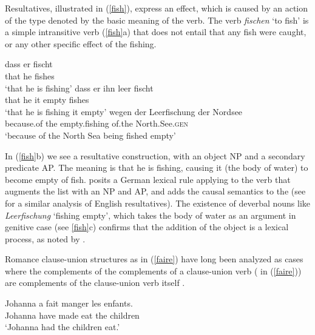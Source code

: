 \documentclass[output=paper]{langsci/langscibook}
\begin{document}
Resultatives, illustrated in (\ref{fish}), express an effect, which is caused by an action of the type denoted by the basic meaning of the verb. The verb \textit{fischen} `to fish' is a simple intransitive verb (\ref{fish}a) that does not entail that any fish were caught, or any other specific effect of the fishing.  

\begin{exe}
\ex\label{fish}
\begin{xlist}
\ex
\gll dass er  fischt\\
     that he  fishes\\
\glt `that he is fishing'
\ex 
\gll dass er ihn leer fischt\\
     that he it empty fishes\\
\glt `that he is fishing it empty'
\ex 
\gll wegen der Leerfischung der Nordsee \\
     because.of the empty.fishing of.the North.See.\textsc{gen} \\
\glt `because of the North Sea being fished empty'
\end{xlist}
\end{exe}

\noindent
 In (\ref{fish}b) we see a resultative construction, with an object NP and a secondary predicate AP.  The meaning is that he is fishing, causing it (the body of water) to become empty of fish.  \citet{Mueller:2002} posits a German lexical rule applying to the verb that augments the \argst list with an NP and AP, and adds the causal semantics to the \content (see \cite{Wechsler2005result} for a similar analysis of English resultatives).     The existence of deverbal nouns like \textit{Leerfischung} `fishing empty', which takes the body of water as an argument in genitive case (see \ref{fish}c) confirms that the addition of the object is a lexical process, as noted by \citet{Mueller:2002}.  

Romance clause-union structures as in (\ref{faire}) have long been analyzed as cases where the complements of the complements of a clause-union verb ( in (\ref{faire})) are complements of the clause-union verb itself \citep{Aissen1979}. 

\begin{exe}
\ex \label{faire}
\gll Johanna a fait manger les enfants. \\
Johanna have made eat the children \\
\glt `Johanna had the children eat.'
\end{exe}
\end{document}
